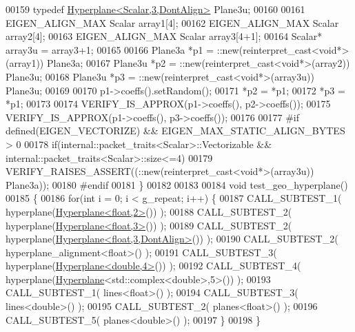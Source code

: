 \begin{DoxyCode}
00159   \textcolor{keyword}{typedef} \hyperlink{group___geometry___module_class_eigen_1_1_hyperplane}{Hyperplane<Scalar,3,DontAlign>} Plane3u;
00160 
00161   EIGEN\_ALIGN\_MAX Scalar array1[4];
00162   EIGEN\_ALIGN\_MAX Scalar array2[4];
00163   EIGEN\_ALIGN\_MAX Scalar array3[4+1];
00164   Scalar* array3u = array3+1;
00165 
00166   Plane3a *p1 = ::new(reinterpret\_cast<void*>(array1)) Plane3a;
00167   Plane3u *p2 = ::new(reinterpret\_cast<void*>(array2)) Plane3u;
00168   Plane3u *p3 = ::new(reinterpret\_cast<void*>(array3u)) Plane3u;
00169   
00170   p1->coeffs().setRandom();
00171   *p2 = *p1;
00172   *p3 = *p1;
00173 
00174   VERIFY\_IS\_APPROX(p1->coeffs(), p2->coeffs());
00175   VERIFY\_IS\_APPROX(p1->coeffs(), p3->coeffs());
00176   
00177 \textcolor{preprocessor}{  #if defined(EIGEN\_VECTORIZE) && EIGEN\_MAX\_STATIC\_ALIGN\_BYTES > 0}
00178   \textcolor{keywordflow}{if}(internal::packet\_traits<Scalar>::Vectorizable && internal::packet\_traits<Scalar>::size<=4)
00179     VERIFY\_RAISES\_ASSERT((::\textcolor{keyword}{new}(reinterpret\_cast<void*>(array3u)) Plane3a));
00180 \textcolor{preprocessor}{  #endif}
00181 \}
00182 
00183 
00184 \textcolor{keywordtype}{void} test\_geo\_hyperplane()
00185 \{
00186   \textcolor{keywordflow}{for}(\textcolor{keywordtype}{int} i = 0; i < g\_repeat; i++) \{
00187     CALL\_SUBTEST\_1( hyperplane(\hyperlink{group___geometry___module_class_eigen_1_1_hyperplane}{Hyperplane<float,2>}()) );
00188     CALL\_SUBTEST\_2( hyperplane(\hyperlink{group___geometry___module_class_eigen_1_1_hyperplane}{Hyperplane<float,3>}()) );
00189     CALL\_SUBTEST\_2( hyperplane(\hyperlink{group___geometry___module_class_eigen_1_1_hyperplane}{Hyperplane<float,3,DontAlign>}()) );
00190     CALL\_SUBTEST\_2( hyperplane\_alignment<float>() );
00191     CALL\_SUBTEST\_3( hyperplane(\hyperlink{group___geometry___module_class_eigen_1_1_hyperplane}{Hyperplane<double,4>}()) );
00192     CALL\_SUBTEST\_4( hyperplane(\hyperlink{group___geometry___module_class_eigen_1_1_hyperplane}{Hyperplane}<std::complex<double>,5>()) );
00193     CALL\_SUBTEST\_1( lines<float>() );
00194     CALL\_SUBTEST\_3( lines<double>() );
00195     CALL\_SUBTEST\_2( planes<float>() );
00196     CALL\_SUBTEST\_5( planes<double>() );
00197   \}
00198 \}
\end{DoxyCode}
